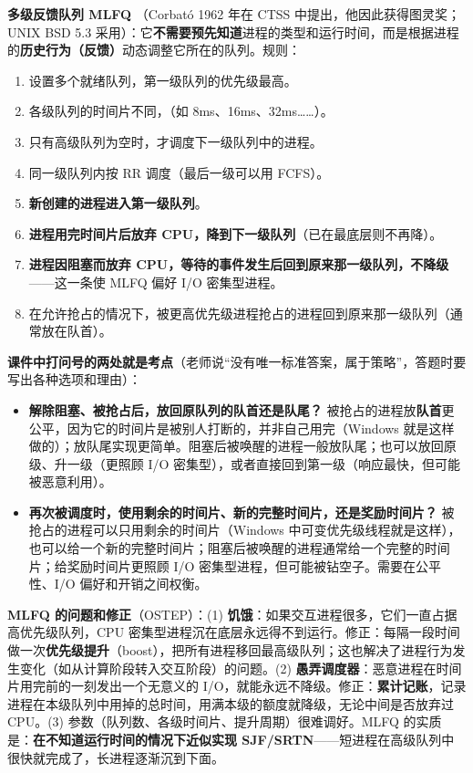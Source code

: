 \textbf{多级反馈队列 MLFQ} \bk（Corbató 1962 年在 CTSS 中提出，他因此获得图灵奖；UNIX BSD 5.3 采用）：它\textbf{不需要预先知道}进程的类型和运行时间，而是根据进程的\textbf{历史行为（反馈）}动态调整它所在的队列。规则：
\begin{enumerate}
    \item 设置多个就绪队列，第一级队列的优先级最高。
    \item 各级队列的时间片不同，（如 8ms、16ms、32ms……）。
    \item 只有高级队列为空时，才调度下一级队列中的进程。
    \item 同一级队列内按 RR 调度（最后一级可以用 FCFS）。
    \item \textbf{新创建的进程进入第一级队列}。
    \item \textbf{进程用完时间片后放弃 CPU，降到下一级队列}（已在最底层则不再降）。
    \item \textbf{进程因阻塞而放弃 CPU，等待的事件发生后回到原来那一级队列，不降级}——这一条使 MLFQ 偏好 I/O 密集型进程。
    \item 在允许抢占的情况下，被更高优先级进程抢占的进程回到原来那一级队列（通常放在队首）。
\end{enumerate}
\textbf{课件中打问号的两处就是考点}（老师说“没有唯一标准答案，属于策略”，答题时要写出各种选项和理由）：
\begin{itemize}
    \item \textbf{解除阻塞、被抢占后，放回原队列的队首还是队尾？} 被抢占的进程放\textbf{队首}更公平，因为它的时间片是被别人打断的，并非自己用完（Windows 就是这样做的）；放队尾实现更简单。阻塞后被唤醒的进程一般放队尾；也可以放回原级、升一级（更照顾 I/O 密集型），或者直接回到第一级（响应最快，但可能被恶意利用）。
    \item \textbf{再次被调度时，使用剩余的时间片、新的完整时间片，还是奖励时间片？} 被抢占的进程可以只用剩余的时间片（Windows 中可变优先级线程就是这样），也可以给一个新的完整时间片；阻塞后被唤醒的进程通常给一个完整的时间片；给奖励时间片更照顾 I/O 密集型进程，但可能被钻空子。需要在公平性、I/O 偏好和开销之间权衡。
\end{itemize}
\textbf{MLFQ 的问题和修正}（OSTEP）：(1) \textbf{饥饿}：如果交互进程很多，它们一直占据高优先级队列，CPU 密集型进程沉在底层永远得不到运行。修正：每隔一段时间做一次\textbf{优先级提升}（boost），把所有进程移回最高级队列；这也解决了进程行为发生变化（如从计算阶段转入交互阶段）的问题。(2) \textbf{愚弄调度器}：恶意进程在时间片用完前的一刻发出一个无意义的 I/O，就能永远不降级。修正：\textbf{累计记账}，记录进程在本级队列中用掉的总时间，用满本级的额度就降级，无论中间是否放弃过 CPU。(3) 参数（队列数、各级时间片、提升周期）很难调好。MLFQ 的实质是：\textbf{在不知道运行时间的情况下近似实现 SJF/SRTN}——短进程在高级队列中很快就完成了，长进程逐渐沉到下面。

